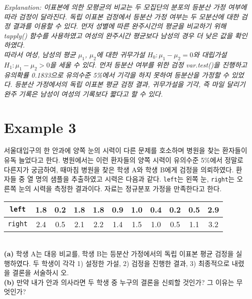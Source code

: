 \documentclass{article}
\begin{document}
\emph{Explanation: 이표본에 의한 모평균의 비교는 두 모집단의 분포의 등분산 가정 여부에 따라 검정이 달라진다. 독립 이표본 검정에서 등분산 가정 여부는 두 모분산에 대한 검정 결과를 이용할 수 있다. 먼저 성별에 따른 완주시간의 평균을 비교하기 위해 tapply() 함수를 사용하였고 여성의 완주시간 평균보다 남성의 경우 더 낮은 값을 확인하였다. \\
따라서 여성, 남성의 평균 $\mu_1$, $\mu_2$에 대한 귀무가설 $H_0: \mu_1-\mu_2=0$와 대립가설 $H_1: \mu_1-\mu_2 > 0$을 세울 수 있다. 먼저 등분산 여부를 위한 검정 var.test()을 진행하고 유의확률 0.1833으로 유의수준 5\%에서 기각을 하지 못하여 등분산을 가정할 수 있었다. 등분산 가정에서의 독립 이표본 평균 검정 결과, 귀무가설을 기각, 즉 마일 달리기 완주 기록은 남성이 여성의 기록보다 짧다고 할 수 있다.} \\

\section*{Example 3}
서울대입구의 한 안과에 양쪽 눈의 시력이 다른 문제를 호소하며 병원을 찾는 환자들이 유독 늘었다고 한다. 병원에서는 이런 환자들의 양쪽 시력이 유의수준 5\%에서 정말로 다른지가 궁금하여, 때마침 병원을 찾은 학생 A와 학생 B에게 검정을 의뢰하였다. 환자들 중 열 명의 샘플을 추출하였고 시력은 다음과 같다. \texttt{left}는 왼쪽 눈, \texttt{right}는 오른쪽 눈의 시력을 측정한 결과이다. 자료는 정규분포
가정을 만족한다고 한다.
\begin{table}[htb!]
\centering
\begin{tabular}{ |c|cccccccccc|  }
 \hline
 \texttt{left} & 1.8 & 0.2 & 1.8 & 1.8 & 0.9 & 1.0 & 0.4 & 0.2 & 0.5 & 2.9 \\
 \hline
 \texttt{right} & 2.4 & 0.5 & 2.1 & 2.2 & 1.4 & 1.5 & 1.0 & 0.5 & 1.1 & 3.2 \\
 \hline
\end{tabular}
\end{table} \\

\textbf{(a)} 학생 A는 대응 비교를, 학생 B는 등분산 가정에서의 독립 이표본 평균 검정을 실행하였다. 두 학생이 각각 1) 설정한 가설, 2) 검정을 진행한 결과, 3) 최종적으로 내렸을 결론을 서술하시
오. \\

\textbf{(b)}  만약 내가 안과 의사라면 두 학생 중 누구의 결론을 신뢰할 것인가? 그 이유는 무엇인가?
\end{document}
